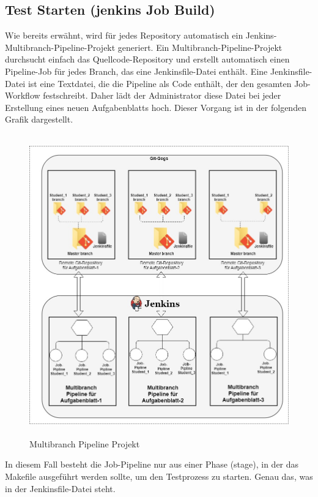 \documentclass[a4paper,12pt,oneside]{book}
\begin{document}
\subsection{Test Starten (jenkins Job Build)}
Wie bereits erwähnt, wird für jedes Repository automatisch ein Jenkins-Multibranch-Pipeline-Projekt generiert. Ein Multibranch-Pipeline-Projekt durchsucht einfach das Quellcode-Repository und erstellt automatisch einen Pipeline-Job für jedes Branch, das eine Jenkinsfile-Datei enthält. 
\newline
Eine Jenkinsfile-Datei ist eine Textdatei, die die Pipeline als Code enthält, der den gesamten Job-Workflow festschreibt. Daher lädt der Administrator diese Datei bei jeder Erstellung eines neuen Aufgabenblatts hoch. Dieser Vorgang ist in der folgenden Grafik dargestellt.
\begin{figure}[h!]
	\begin{center}
		\includegraphics[width=13cm, height=13cm]{GogsJenkins.jpg}
		\caption{Multibranch Pipeline Projekt} 
		\label{ Multibranch Pipeline Projek } 
	\end{center}
\end{figure}
\newline
In diesem Fall besteht die Job-Pipeline nur aus einer Phase (stage), in der das Makefile ausgeführt werden sollte, um den Testprozess zu starten. Genau das, was in der Jenkinsfile-Datei steht.
\end{document}

